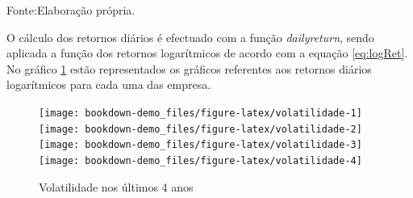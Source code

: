 \documentclass[
  12pt,
  a4paper,
  openany]{book}
\newenvironment{Shaded}{\begin{snugshade}}{\end{snugshade}}
\newcommand{\DataTypeTok}[1]{\textcolor[rgb]{0.13,0.29,0.53}{#1}}
\newcommand{\DecValTok}[1]{\textcolor[rgb]{0.00,0.00,0.81}{#1}}
\newcommand{\KeywordTok}[1]{\textcolor[rgb]{0.13,0.29,0.53}{\textbf{#1}}}
\newcommand{\NormalTok}[1]{#1}
\newcommand{\OperatorTok}[1]{\textcolor[rgb]{0.81,0.36,0.00}{\textbf{#1}}}
\newcommand{\StringTok}[1]{\textcolor[rgb]{0.31,0.60,0.02}{#1}}
\begin{document}
Fonte:Elaboração própria.

\justifying
\bigskip

O cálculo dos retornos diários é efectuado com a função \emph{dailyreturn}, sendo aplicada a função dos retornos logarítmicos de acordo com a equação \eqref{eq:logRet}. No gráfico \ref{fig:volatilidade} estão representados os gráficos referentes aos retornos diários logarítmicos para cada uma das empresa.

\scriptsize

\begin{Shaded}
\end{Shaded}

\normalsize

\begin{figure}

{\centering \texttt{[image: bookdown-demo\_files/figure-latex/volatilidade-1]} \texttt{[image: bookdown-demo\_files/figure-latex/volatilidade-2]} \texttt{[image: bookdown-demo\_files/figure-latex/volatilidade-3]} \texttt{[image: bookdown-demo\_files/figure-latex/volatilidade-4]} 

}

\caption{Volatilidade nos últimos 4 anos}\label{fig:volatilidade}
\end{figure}
\FloatBarrier
\centering
\end{document}
